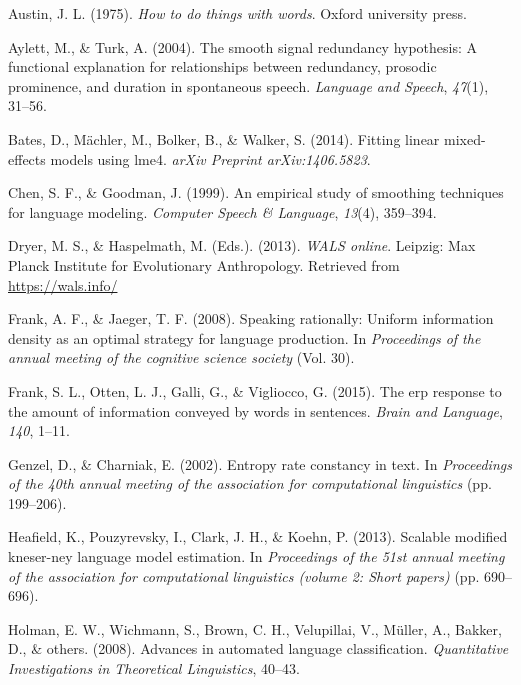 \documentclass[man,floatsintext]{apa6}
\begin{document}
\leavevmode\hypertarget{ref-austin1975}{}%
Austin, J. L. (1975). \emph{How to do things with words}. Oxford university press.

\leavevmode\hypertarget{ref-aylett2004}{}%
Aylett, M., \& Turk, A. (2004). The smooth signal redundancy hypothesis: A functional explanation for relationships between redundancy, prosodic prominence, and duration in spontaneous speech. \emph{Language and Speech}, \emph{47}(1), 31--56.

\leavevmode\hypertarget{ref-bates2014}{}%
Bates, D., Mächler, M., Bolker, B., \& Walker, S. (2014). Fitting linear mixed-effects models using lme4. \emph{arXiv Preprint arXiv:1406.5823}.

\leavevmode\hypertarget{ref-chen1999empirical}{}%
Chen, S. F., \& Goodman, J. (1999). An empirical study of smoothing techniques for language modeling. \emph{Computer Speech \& Language}, \emph{13}(4), 359--394.

\leavevmode\hypertarget{ref-wals}{}%
Dryer, M. S., \& Haspelmath, M. (Eds.). (2013). \emph{WALS online}. Leipzig: Max Planck Institute for Evolutionary Anthropology. Retrieved from \url{https://wals.info/}

\leavevmode\hypertarget{ref-frank2008}{}%
Frank, A. F., \& Jaeger, T. F. (2008). Speaking rationally: Uniform information density as an optimal strategy for language production. In \emph{Proceedings of the annual meeting of the cognitive science society} (Vol. 30).

\leavevmode\hypertarget{ref-frank2015}{}%
Frank, S. L., Otten, L. J., Galli, G., \& Vigliocco, G. (2015). The erp response to the amount of information conveyed by words in sentences. \emph{Brain and Language}, \emph{140}, 1--11.

\leavevmode\hypertarget{ref-genzel2002}{}%
Genzel, D., \& Charniak, E. (2002). Entropy rate constancy in text. In \emph{Proceedings of the 40th annual meeting of the association for computational linguistics} (pp. 199--206).

\leavevmode\hypertarget{ref-heafield2013scalable}{}%
Heafield, K., Pouzyrevsky, I., Clark, J. H., \& Koehn, P. (2013). Scalable modified kneser-ney language model estimation. In \emph{Proceedings of the 51st annual meeting of the association for computational linguistics (volume 2: Short papers)} (pp. 690--696).

\leavevmode\hypertarget{ref-holman2008}{}%
Holman, E. W., Wichmann, S., Brown, C. H., Velupillai, V., Müller, A., Bakker, D., \& others. (2008). Advances in automated language classification. \emph{Quantitative Investigations in Theoretical Linguistics}, 40--43.
\end{document}
